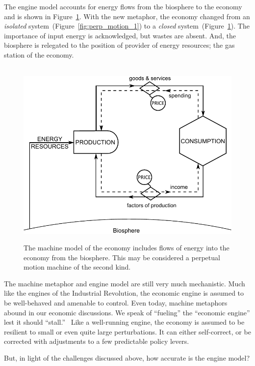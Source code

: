 The engine model accounts for energy flows from the biosphere 
to the economy and is shown in Figure~\ref{fig:perp_motion_2}.
With the new metaphor, the economy changed from 
an \emph{isolated} system~(Figure~\ref{fig:perp_motion_1}) to 
a \emph{closed} system~(Figure~\ref{fig:perp_motion_2}). 
The importance of input energy is acknowledged, 
but wastes are absent.
And, the biosphere is relegated to the position
of provider of energy resources;
the gas station of the economy.\cite{Norgaard2010}

\begin{figure}[H]
\centering\
\includegraphics[width=\linewidth]{Part_0/Chapter_Introduction/images/Perpetual_motion_2.pdf}
\caption[The machine model]{The machine model of the economy includes
flows of energy into the economy from the biosphere.
This may be considered a perpetual motion machine 
of the second kind.}
\label{fig:perp_motion_2}
\end{figure}

The machine metaphor and engine model are still very much mechanistic.
Much like the engines of the Industrial Revolution,
the economic engine is assumed to be well-behaved and amenable to control.
Even today, machine metaphors abound in our economic discussions.
We speak of ``fueling'' the ``economic engine'' 
lest it should ``stall.''~\cite{Liu2012}
Like a well-running engine, the economy is assumed 
to be resilient to small or even quite large perturbations.  
It can either self-correct, 
or be corrected with adjustments to
a few predictable policy levers.

But, in light of the challenges discussed above,
how accurate is the engine model?

